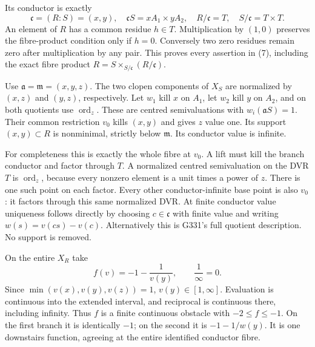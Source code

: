 \documentclass[11pt]{article}
\begin{document}
Its conductor is exactly
\[
 \mathfrak c=(R:S)=(x,y),\quad
 \mathfrak cS=xA_1\times yA_2,\quad
 R/\mathfrak c=T,\quad S/\mathfrak c=T\times T.                  \tag{7}
\]
An element of \(R\) has a common residue \(h\in T\). Multiplication
by \((1,0)\) preserves the fibre-product condition only if \(h=0\).
Conversely two zero residues remain zero after multiplication by
any pair. This proves every assertion in (7), including the exact
fibre product \(R=S\times_{S/\mathfrak c}(R/\mathfrak c)\).

Use \(\mathfrak a=\mathfrak m=(x,y,z)\).
The two clopen components of \(X_S\) are normalized by
\((x,z)\) and \((y,z)\), respectively. Let \(w_1\) kill \(x\) on
\(A_1\), let \(w_2\) kill \(y\) on \(A_2\), and on both quotients
use \(\operatorname{ord}_z\). These are centred semivaluations
with \(w_i(\mathfrak aS)=1\).
Their common restriction \(v_0\) kills \((x,y)\) and gives \(z\)
value one. Its support \((x,y)\subset R\) is nonminimal, strictly
below \(\mathfrak m\). Its conductor value is infinite.

For completeness this is exactly the whole fibre at \(v_0\).
A lift must kill the branch conductor and factor through \(T\).
A normalized centred semivaluation on the DVR \(T\) is
\(\operatorname{ord}_z\), because every nonzero element is a unit
times a power of \(z\). There is one such point on each factor.
Every other conductor-infinite base point is also \(v_0\):
it factors through this same normalized DVR.
At finite conductor value uniqueness follows directly by choosing
\(c\in\mathfrak c\) with finite value and writing
\(w(s)=v(cs)-v(c)\). Alternatively this is G331's full quotient
description. No support is removed.

On the entire \(X_R\) take
\[
 f(v)=-1-\frac1{v(y)},\qquad \frac1\infty=0.                    \tag{8}
\]
Since \(\min(v(x),v(y),v(z))=1\), \(v(y)\in[1,\infty]\).
Evaluation is continuous into the extended interval, and reciprocal
is continuous there, including infinity. Thus \(f\) is a finite
continuous obstacle with \(-2\leq f\leq-1\).
On the first branch it is identically \(-1\); on the second it is
\(-1-1/w(y)\). It is one downstairs function, agreeing at the
entire identified conductor fibre.
\end{document}
